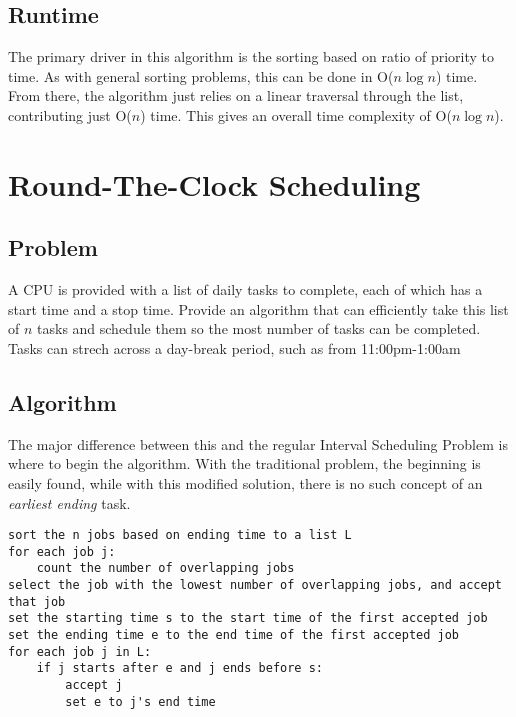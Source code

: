 \documentclass[titlepage]{article}
\numberwithin{equation}{subsection}
\begin{document}
\subsection{Runtime}
The primary driver in this algorithm is the sorting based on ratio of priority to time. As with general
sorting problems, this can be done in O($n\log n$) time. From there, the algorithm just relies on a linear
traversal through the list, contributing just O($n$) time. This gives an overall time complexity of O($n\log n$).
\section{Round-The-Clock Scheduling}
\subsection{Problem}
A CPU is provided with a list of daily tasks to complete, each of which has a start time and a stop time.
Provide an algorithm that can efficiently take this list of $n$ tasks and schedule them so the most number
of tasks can be completed. Tasks can strech across a day-break period, such as from 11:00pm-1:00am
\subsection{Algorithm}
The major difference between this and the regular Interval Scheduling Problem is where to begin the
algorithm. With the traditional problem, the beginning is easily found, while with this modified solution,
there is no such concept of an \textit{earliest ending} task.
\begin{lstlisting}
sort the n jobs based on ending time to a list L
for each job j:
    count the number of overlapping jobs
select the job with the lowest number of overlapping jobs, and accept that job
set the starting time s to the start time of the first accepted job
set the ending time e to the end time of the first accepted job
for each job j in L:
    if j starts after e and j ends before s:
        accept j
        set e to j's end time
\end{lstlisting}
\end{document}
